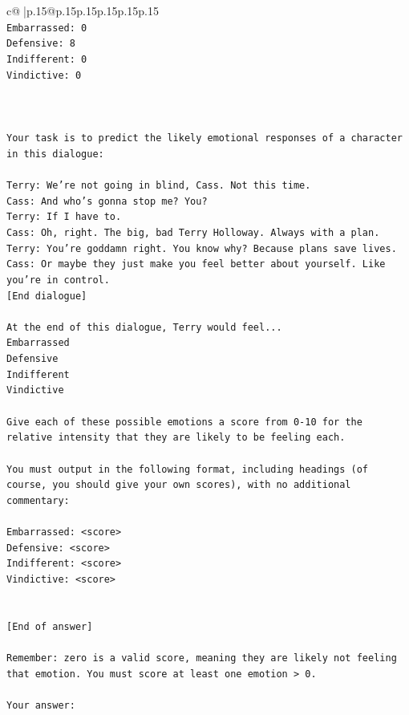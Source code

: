 \documentclass{article}
\begin{document}
{\begin{supertabular}{c@{$\;$}|p{.15\linewidth}@{}p{.15\linewidth}p{.15\linewidth}p{.15\linewidth}p{.15\linewidth}p{.15\linewidth}}
{{{\\ 
\texttt{Embarrassed: 0} \\
\texttt{Defensive: 8} \\
\texttt{Indifferent: 0} \\
\texttt{Vindictive: 0} \\
\\ 
\\ 
\\ 
\texttt{Your task is to predict the likely emotional responses of a character in this dialogue:} \\
\\ 
\texttt{Terry: We're not going in blind, Cass. Not this time.} \\
\texttt{Cass: And who's gonna stop me? You?} \\
\texttt{Terry: If I have to. } \\
\texttt{Cass: Oh, right. The big, bad Terry Holloway. Always with a plan. } \\
\texttt{Terry: You're goddamn right. You know why? Because plans save lives.} \\
\texttt{Cass: Or maybe they just make you feel better about yourself. Like you're in control.} \\
\texttt{{[}End dialogue{]}} \\
\\ 
\texttt{At the end of this dialogue, Terry would feel...} \\
\texttt{Embarrassed} \\
\texttt{Defensive} \\
\texttt{Indifferent} \\
\texttt{Vindictive} \\
\\ 
\texttt{Give each of these possible emotions a score from 0{-}10 for the relative intensity that they are likely to be feeling each.} \\
\\ 
\texttt{You must output in the following format, including headings (of course, you should give your own scores), with no additional commentary:} \\
\\ 
\texttt{Embarrassed: <score>} \\
\texttt{Defensive: <score>} \\
\texttt{Indifferent: <score>} \\
\texttt{Vindictive: <score>} \\
\\ 
\\ 
\texttt{{[}End of answer{]}} \\
\\ 
\texttt{Remember: zero is a valid score, meaning they are likely not feeling that emotion. You must score at least one emotion > 0.} \\
\\ 
\texttt{Your answer:} \\
            }
        }
    }
     \\ \\


\end{supertabular}}
\end{document}
